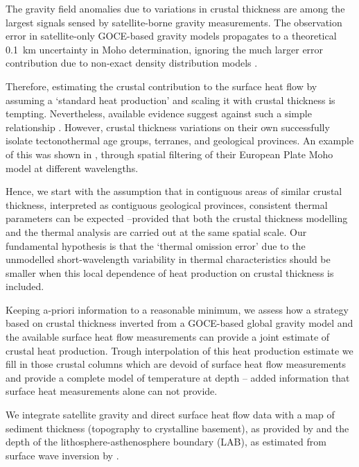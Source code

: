 The gravity field anomalies due to variations in crustal thickness are among the largest signals sensed by satellite-borne gravity measurements.
The observation error in satellite-only GOCE-based gravity models propagates to a theoretical 0.1~km uncertainty in Moho determination, ignoring the much larger error contribution due to non-exact density distribution models \parencite{braitenberg2011goce}.

Therefore, estimating the crustal contribution to the surface heat flow by assuming a `standard heat production' and scaling it with crustal thickness is tempting.
Nevertheless, available evidence suggest against such a simple relationship \parencite{Mareschal2013}.
However, crustal thickness variations on their own successfully isolate tectonothermal age groups, terranes, and geological provinces.
An example of this was shown in \textcite{Grad2009}, through spatial filtering of their European Plate Moho model at different wavelengths.

Hence, we start with the assumption that in contiguous areas of similar crustal thickness, interpreted as contiguous geological provinces, consistent thermal parameters can be expected --provided that both the crustal thickness modelling and the thermal analysis are carried out at the same spatial scale.
Our fundamental hypothesis is that the `thermal omission error' due to the unmodelled short-wavelength variability in thermal characteristics should be smaller when this local dependence of heat production on crustal thickness is included.

Keeping a-priori information to a reasonable minimum, we assess how a strategy based on crustal thickness inverted from a GOCE-based global gravity model and the available surface heat flow measurements can provide a joint estimate of crustal heat production.
Trough interpolation of this heat production estimate we fill in those crustal columns which are devoid of surface heat flow measurements and provide a complete model of temperature at depth -- added information that surface heat measurements alone can not provide. 

We integrate satellite gravity and direct surface heat flow data with a map of sediment thickness (topography to crystalline basement), as provided by \textcite{Tesauro2008} and the depth of the lithosphere-asthenosphere boundary (LAB), as estimated from surface wave inversion by \textcite{Pasyanos2014}.

